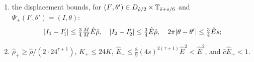 \begin{lemma}
\begin{enumerate}[label=(\roman*)]
\[\sup_{D_{\hat\rho/16}}\abs{\hat\imath_{+,i}-\mathrm{id}_i}\le10\frac{\bar M_i}{\bar M}\hat E\hat\rho\ (\le10\hat E\hat\rho,\ i=1,2),\qquad L_D(\hat\imath_+-\mathrm{id})\le640\,n\hat E;\]
(where $\omega_0$ here means the frequency map of the current $h$, and $L_D$ is the Lipschitz constant on the set $D$);
\item the displacement bounds, for $(I',\theta')\in D_{\hat\rho/2}\times\mathbb{T}_{\bar s+s/6}$ and $\Psi_+(I',\theta')=(I,\theta)$:
\[\lvert I_1-I_1'\rvert\le\tfrac34\tfrac{\hat M}M\hat E\hat\rho,\quad\lvert I_2-I_2'\rvert\le\tfrac34\hat E\hat\rho,\quad2\pi\lvert \theta-\theta'\rvert\le\tfrac34\hat Es;\]
\item $\hat\rho_+\ge\hat\rho/(2\cdot24^{\tau+1})$, $K_+\le24K$, $\hat E_+\le\frac89(4s)^{2(\tau+1)}\hat E^2<\hat E^2$, and $\hat c\hat E_+<1$.
\end{enumerate}
\end{lemma}

